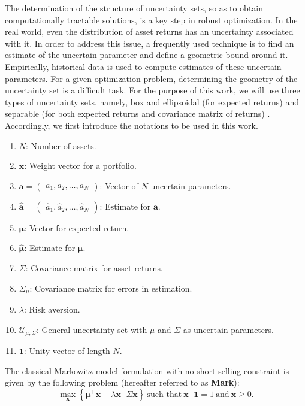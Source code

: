 \documentclass[12pt]{article}
\numberwithin{equation}{section}
\begin{document}
The determination of the structure of uncertainty sets, so as to obtain computationally tractable solutions, is a key step in robust optimization. In the real world, even the distribution of asset returns has an uncertainty associated with it. In order to address this issue, a frequently used technique is to find an estimate of the uncertain parameter and define a geometric bound around it. Empirically, historical data is used to compute estimates of these uncertain parameters. For a given optimization problem, determining the geometry of the uncertainty set is a difficult task. For the purpose of this work, we will use three types of uncertainty sets, namely, box and ellipsoidal (for expected returns) \cite{Fabozzi07,Kim14} and separable (for both expected returns and covariance matrix of returns) \cite{Lu06}. Accordingly, we first introduce the notations to be used in this work.
\begin{enumerate}
\item $N$: Number of assets.
\item $\displaystyle{\mathbf{x}}$: Weight vector for a portfolio.
\item $\displaystyle{\mathbf{a}=\begin{pmatrix} a_{1}, a_{2}, \dots , a_{N} \end{pmatrix}}$: Vector of $N$ uncertain parameters.
\item $\displaystyle{\mathbf{\hat{a}}=\begin{pmatrix}\hat{a}_{1}, \hat{a}_{2}, \dots, \hat{a}_{N} \end{pmatrix}}$: Estimate for $\displaystyle{\mathbf{a}}$.
\item $\displaystyle{\boldsymbol{\mu}}$: Vector for expected return.
\item $\displaystyle{\boldsymbol{{\hat{\mu}}}}$: Estimate for $\displaystyle{\boldsymbol{\mu}}$.
\item $\displaystyle{\Sigma}$: Covariance matrix for asset returns.
\item $\displaystyle{\Sigma_{\mu}}$: Covariance matrix for errors in estimation.
\item $\lambda$: Risk aversion.
\item $\displaystyle{\mathcal{U}_{\mu,\Sigma}}$: General uncertainty set with $\mu$ and $\Sigma$ as uncertain parameters.
\item $\displaystyle{\mathbf{1}}$: Unity vector of length $N$.
\end{enumerate}

The classical Markowitz model formulation with no short selling constraint is given by the following problem (hereafter referred to as \textbf{Mark}):
\begin{equation}
\label{eq:classical_markowitz}
\max\limits_{\mathbf{x}}\left\{\boldsymbol{\mu}^{\top}\mathbf{x}-\lambda\mathbf{x^{\top}}\Sigma\mathbf{x}\right\}~\text{such that}~
\mathbf{x^{\top}}\mathbf{1}=1~\text{and}~\mathbf{x}\geq 0.
\end{equation}
\end{document}
